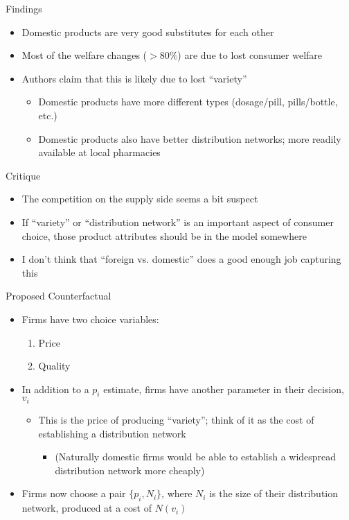 \documentclass{beamer}
\begin{document}
%
\begin{frame}{Findings}
  \begin{itemize}
  \item  Domestic products are very good substitutes for each other
    \vfill
  \item Most of the welfare changes ($>80\%$) are due to lost consumer welfare
    \vfill
  \item Authors claim that this is likely due to lost ``variety''
    \begin{itemize}
    \item Domestic products have more different types (dosage/pill, pills/bottle, etc.)
      \item Domestic products also have better distribution networks; more readily available at local pharmacies
    \end{itemize}
  \end{itemize}
\end{frame}
%
\begin{frame}{Critique}
  \begin{itemize}
  \item The competition on the supply side seems a bit suspect
    \vfill
  \item If ``variety'' or ``distribution network'' is an important aspect of consumer choice, those product attributes should be in the model somewhere
    \vfill
  \item I don't think that ``foreign vs. domestic'' does a good enough job capturing this
  \end{itemize}
\end{frame}
%
\begin{frame}{Proposed Counterfactual}
  \begin{itemize}
  \item Firms have two choice variables:
    \begin{enumerate}
    \item Price
      \item Quality
    \end{enumerate}
    \vfill
  \item In addition to a $p_i$ estimate, firms have another parameter in their decision, $v_i$
    \begin{itemize}
    \item This is the price of producing ``variety''; think of it as the cost of establishing a distribution network
      \begin{itemize}
      \item (Naturally domestic firms would be able to establish a widespread distribution network more cheaply)
      \end{itemize}
    \end{itemize}
    \vfill
    \item Firms now choose a pair $\{p_i, N_i\}$, where $N_i$ is the size of their distribution network, produced at a cost of $N(v_i)$
  \end{itemize}
\end{frame}
\end{document}
